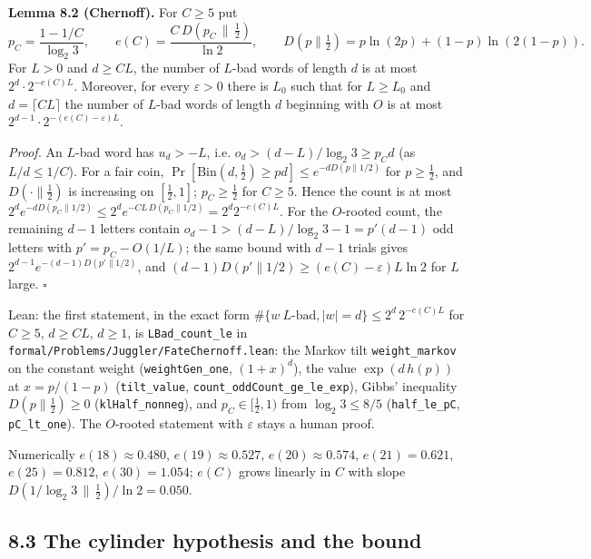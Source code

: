 \documentclass[11pt,a4paper]{article}
\begin{document}
\textbf{Lemma 8.2 (Chernoff).} For \(C\ge 5\) put \[
p_C=\frac{1-1/C}{\log_2 3},\qquad
e(C)=\frac{C\,D(p_C\,\|\,\tfrac12)}{\ln 2},\qquad
D(p\|\tfrac12)=p\ln(2p)+(1-p)\ln(2(1-p)).
\] For \(L>0\) and \(d\ge CL\), the number of \(L\)-bad words of length
\(d\) is at most \(2^d\cdot 2^{-e(C)L}\). Moreover, for every
\(\varepsilon>0\) there is \(L_0\) such that for \(L\ge L_0\) and
\(d=\lceil CL\rceil\) the number of \(L\)-bad words of length \(d\)
beginning with \(O\) is at most
\(2^{d-1}\cdot 2^{-(e(C)-\varepsilon)L}\).

\emph{Proof.} An \(L\)-bad word has \(u_d>-L\), i.e.
\(o_d>(d-L)/\log_2 3\ge p_Cd\) (as \(L/d\le 1/C\)). For a fair coin,
\(\Pr[\mathrm{Bin}(d,\tfrac12)\ge pd]\le e^{-dD(p\|1/2)}\) for
\(p\ge\tfrac12\), and \(D(\cdot\|\tfrac12)\) is increasing on
\([\tfrac12,1]\); \(p_C\ge\tfrac12\) for \(C\ge 5\). Hence the count is
at most
\(2^de^{-dD(p_C\|1/2)}\le 2^de^{-CL\,D(p_C\|1/2)}=2^d2^{-e(C)L}\). For
the \(O\)-rooted count, the remaining \(d-1\) letters contain
\(o_d-1>(d-L)/\log_2 3-1=p'(d-1)\) odd letters with \(p'=p_C-O(1/L)\);
the same bound with \(d-1\) trials gives
\(2^{d-1}e^{-(d-1)D(p'\|1/2)}\), and
\((d-1)D(p'\|1/2)\ge(e(C)-\varepsilon)L\ln 2\) for \(L\) large.
\(\square\)

Lean: the first statement, in the exact form
\(\#\{w\ L\text{-bad},|w|=d\}\le 2^d\,2^{-e(C)L}\) for \(C\ge 5\),
\(d\ge CL\), \(d\ge 1\), is \texttt{\nolinkurl{LBad_count_le}} in
\texttt{\nolinkurl{formal/Problems/Juggler/FateChernoff.lean}}: the
Markov tilt \texttt{\nolinkurl{weight_markov}} on the constant weight
(\texttt{\nolinkurl{weightGen_one}}, \((1+x)^d\)), the value
\(\exp(d\,h(p))\) at \(x=p/(1-p)\) (\texttt{\nolinkurl{tilt_value}},
\texttt{\nolinkurl{count_oddCount_ge_le_exp}}), Gibbs' inequality
\(D(p\|\tfrac12)\ge 0\) (\texttt{\nolinkurl{klHalf_nonneg}}), and
\(p_C\in[\tfrac12,1)\) from \(\log_2 3\le 8/5\)
(\texttt{\nolinkurl{half_le_pC}}, \texttt{\nolinkurl{pC_lt_one}}). The
\(O\)-rooted statement with \(\varepsilon\) stays a human proof.

Numerically \(e(18)\approx0.480\), \(e(19)\approx0.527\),
\(e(20)\approx0.574\), \(e(21)=0.621\), \(e(25)=0.812\),
\(e(30)=1.054\); \(e(C)\) grows linearly in \(C\) with slope
\(D(1/\log_2 3\,\|\,\tfrac12)/\ln 2=0.050\).

\subsection{8.3 The cylinder hypothesis and the
bound}\label{the-cylinder-hypothesis-and-the-bound}
\end{document}
